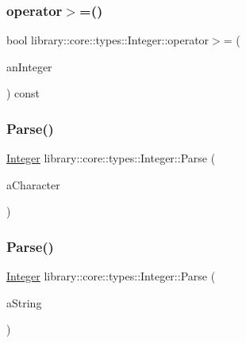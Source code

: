 \subsubsection{\texorpdfstring{operator$>$=()}{operator>=()}\hspace{0.1cm}{\footnotesize\ttfamily [2/2]}}
{\footnotesize\ttfamily bool library\+::core\+::types\+::\+Integer\+::operator$>$= (\begin{DoxyParamCaption}\item[{const \mbox{\hyperlink{classlibrary_1_1core_1_1types_1_1_integer_a623afb1580f870fd8a1997b1c12c917d}{Integer\+::\+Value\+Type}} \&}]{an\+Integer }\end{DoxyParamCaption}) const}

\mbox{\label{classlibrary_1_1core_1_1types_1_1_integer_aaa5f55222db9aeb9ad7fcd8a69109f9d}} 
\subsubsection{\texorpdfstring{Parse()}{Parse()}\hspace{0.1cm}{\footnotesize\ttfamily [1/2]}}
{\footnotesize\ttfamily \mbox{\hyperlink{classlibrary_1_1core_1_1types_1_1_integer}{Integer}} library\+::core\+::types\+::\+Integer\+::\+Parse (\begin{DoxyParamCaption}\item[{char}]{a\+Character }\end{DoxyParamCaption})\hspace{0.3cm}{\ttfamily [static]}}

\mbox{\label{classlibrary_1_1core_1_1types_1_1_integer_a12084c5a23b58ab8f3d28bf69f579253}} 
\subsubsection{\texorpdfstring{Parse()}{Parse()}\hspace{0.1cm}{\footnotesize\ttfamily [2/2]}}
{\footnotesize\ttfamily \mbox{\hyperlink{classlibrary_1_1core_1_1types_1_1_integer}{Integer}} library\+::core\+::types\+::\+Integer\+::\+Parse (\begin{DoxyParamCaption}\item[{const \mbox{\hyperlink{classlibrary_1_1core_1_1types_1_1_string}{types\+::\+String}} \&}]{a\+String }\end{DoxyParamCaption})\hspace{0.3cm}{\ttfamily [static]}}

